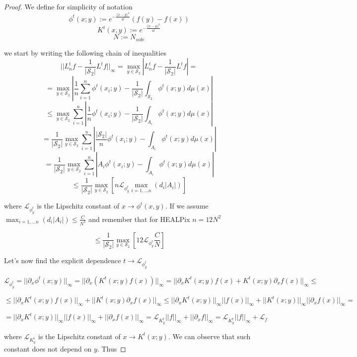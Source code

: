 \begin{proof}
	
	We define for simplicity of notation
	$$\phi^t(x;y) := e^{-\frac{||x-y||^2}{4t}}\left(f(y)-f(x)\right)$$
	$$K^t(x,y) :=  e^{-\frac{||x-y||^2}{4t}}$$
	$$N := N_{side}$$
	
	we start by writing the following chain of inequalities
	$$||L_n^tf-\frac{1}{|\mathcal S_2|}L^tf||_\infty = \max _{y\in \mathcal S_2} \left|L_n^tf-\frac{1}{|\mathcal S_2|}L^tf\right|=$$
	$$= \max _{y\in \mathcal S_2} \left| \frac{1}{n} \sum_{i=1}^n \phi^t(x_i; y)-\frac{1}{|\mathcal S_2|} \int_{\mathcal S_2} \phi^t(x;y)d\mu(x) \right|$$
	$$\leq \max _{y\in \mathcal S_2} \sum_{i=1}^n  \left| \frac{1}{n}  \phi^t(x_i; y)-\frac{1}{|\mathcal S_2|} \int_{A_i} \phi^t(x;y)d\mu(x) \right|$$
	$$= \frac{1}{|\mathcal S_2|} \max _{y\in \mathcal S_2} \sum_{i=1}^n  \left| \frac{|\mathcal S_2|}{n}  \phi^t(x_i; y)-\int_{A_i} \phi^t(x;y)d\mu(x) \right|$$
	$$= \frac{1}{|\mathcal S_2|} \max _{y\in \mathcal S_2} \sum_{i=1}^n  \left| A_i  \phi^t(x_i; y)-\int_{A_i} \phi^t(x;y)d\mu(x) \right|$$
	$$\leq \frac{1}{|\mathcal S_2|} \max _{y\in \mathcal S_2} \left[ n \mathcal L_{\phi^t_y} \max_{i=1,...n} (d_i|A_i|)  \right]$$
	
	where $\mathcal L_{\phi^t_y}$ is the Lipschitz constant of $x \rightarrow \phi^t(x, y)$. If we assume $\max_{i=1,...n} (d_i|A_i|) \leq \frac{C}{N^3}$
	and remember that for HEALPix $n=12N^2$
	
	$$\leq \frac{1}{|\mathcal S_2|} \max _{y\in \mathcal S_2} \left[ 12 \mathcal L_{\phi^t_y} \frac{C}{N} \right]$$
	
	Let's now find the explicit dependence $t\rightarrow \mathcal L_{\phi^t_y}$
	
	$\mathcal L_{\phi^t_y} = ||\partial_x\phi^t(x;y)||_\infty = ||\partial_x\left(K^t(x;y)f(x)\right)||_\infty = ||\partial_x K^t(x;y)f(x) + K^t(x;y)\partial_x f(x)||_\infty \leq$
	
	$ \leq ||\partial_x K^t(x;y)f(x)||_\infty + ||K^t(x;y)\partial_x f(x)||_\infty \leq  ||\partial_x K^t(x;y)||_\infty||f(x)||_\infty + ||K^t(x;y)||_\infty||\partial_x f(x)||_\infty = $
	
	$ = ||\partial_x K^t(x;y)||_\infty||f(x)||_\infty + ||\partial_x f(x)||_\infty = \mathcal L_{K^t_y} ||f||_\infty + ||\partial_xf||_\infty = \mathcal L_{K^t_y} ||f||_\infty + \mathcal L_f$
	
	where $\mathcal L_{K^t_y}$ is the Lipschitz constant of $x\rightarrow K^t(x;y)$. We can observe that such constant does not depend on $y$. Thus
	

\end{proof}

